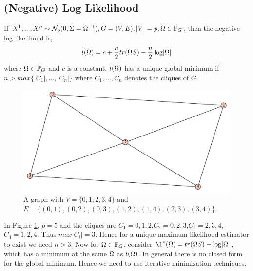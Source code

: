 \documentclass[12pt, leqno]{article}
\providecommand{\abs}[1]{\lvert#1\rvert}
\def\om{\ensuremath\Omega}
\def\pg{\ensuremath\mathbb{P}_{{G}}}
\begin{document}
\subsection{(Negative) Log Likelihood} \label{ssc:nllomega}If $X^{1}, ... , X^{n} \sim \mathcal{N}_p(0,\Sigma =
\Omega^{-1}), G = (V,E), \abs{V} = p, \Omega \in \pg$, then the
negative log likelihood is, 
\[
l(\Omega) = c +
\frac{n}{2}tr(\om S)-\frac{n}{2}\log\abs{\Omega}
\] 
where $\Omega \in \pg$ and $c$ is a constant. $l(\om)$ has a unique
global minimum if $n> max \{\abs{C_1},...,\abs{C_n} \}$ where
$C_1,...,C_n$ denotes the cliques of $G$. 
\begin{figure}
\begin{center}
  \includegraphics [scale=0.4]{h11.pdf}
\end{center}
\caption{A graph with $V = \{0,1,2,3,4\}$ and $E = \{(0,1),(0,2),(0,3),(1,2),(1,4),(2,3),(3,4)\}$.}
\label{clkgraph}
\end{figure}
In Figure \ref{clkgraph}, $p=5$ and the cliques are $C_1 = {0,1,2}$,$C_2 = {0,2,3}$,$C_3 =
{2,3,4}$,$C_4 = {1,2,4}$. Thus $max \abs{C_i} = 3$. Hence for a unique
maximum likelihood estimator to exist we need $n>3$.
Now for $\om \in \pg$, consider $\l^{*}(\om) = tr(\om S) - \log
\abs{\om}$, which has a minimum at the same $\om$ as $l(\om)$. In
general there is no closed form for the global minimum. Hence we need
to use iterative minimization techniques.
\end{document}
